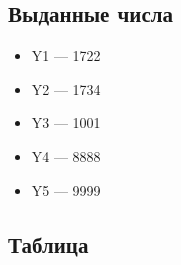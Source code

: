 \subsection{Выданные числа}
\begin{itemize}
  \item Y1 --- 1722
  \item Y2 --- 1734
  \item Y3 --- 1001
  \item Y4 --- 8888
  \item Y5 --- 9999
\end{itemize}

\subsection{Таблица}
\newcommand{\cg}{\rowcolor{green!10}}
\newcommand{\cb}{\rowcolor{blue!10}}
\renewcommand{\hline}{\noalign{\hrule height 1pt}}
